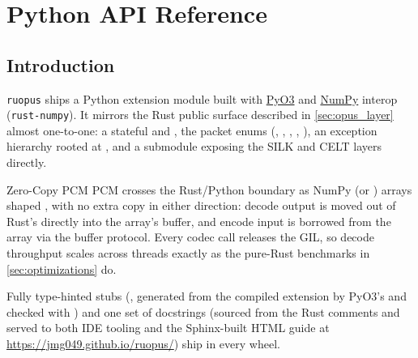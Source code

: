

\section{Python API Reference}\label{sec:python_guide}

\subsection{Introduction}\label{subsec:python_intro}

\texttt{ruopus} ships a Python extension module built with
\href{https://pyo3.rs}{PyO3} and \href{https://numpy.org}{NumPy} interop
(\texttt{rust-numpy}). It mirrors the Rust public surface described in
\cref{sec:opus_layer} almost one-to-one: a stateful  and
, the packet enums (, ,
, , ), an exception hierarchy
rooted at , and a  submodule exposing
the SILK and CELT layers directly.

\begin{concept}{Zero-Copy PCM}
  PCM crosses the Rust/Python boundary as NumPy  (or
  ) arrays shaped , with no extra copy in
  either direction: decode output is moved out of Rust's  directly
  into the array's buffer, and encode input is borrowed from the array via the
  buffer protocol. Every codec call releases the GIL, so decode throughput
  scales across threads exactly as the pure-Rust benchmarks in
  \cref{sec:optimizations} do.
\end{concept}

Fully type-hinted stubs (, generated from the compiled extension by
PyO3's  and checked with ) and one
set of docstrings (sourced from the Rust \code{///} comments and served to
  both IDE tooling and the Sphinx-built HTML guide at
\url{https://jmg049.github.io/ruopus/}) ship in every wheel.

